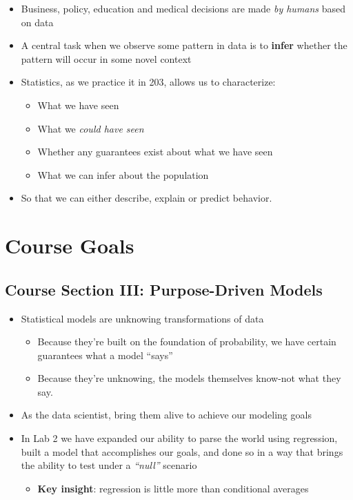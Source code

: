 \documentclass[
]{book}
\providecommand{\tightlist}{%
  \setlength{\itemsep}{0pt}\setlength{\parskip}{0pt}}
\theoremstyle{definition}
\theoremstyle{definition}
\theoremstyle{definition}
\theoremstyle{definition}
\theoremstyle{remark}
\begin{document}
\begin{itemize}
\item
  Business, policy, education and medical decisions are made \emph{by humans} based on data
\item
  A central task when we observe some pattern in data is to \textbf{infer} whether the pattern will occur in some novel context
\item
  Statistics, as we practice it in 203, allows us to characterize:

  \begin{itemize}
  \tightlist
  \item
    What we have seen
  \item
    What we \emph{could have seen}
  \item
    Whether any guarantees exist about what we have seen
  \item
    What we can infer about the population
  \end{itemize}
\item
  So that we can either describe, explain or predict behavior.
\end{itemize}

\hypertarget{course-goals}{%
\section{Course Goals}\label{course-goals}}

\hypertarget{course-section-iii-purpose-driven-models}{%
\subsection{Course Section III: Purpose-Driven Models}\label{course-section-iii-purpose-driven-models}}

\begin{itemize}
\item
  Statistical models are unknowing transformations of data

  \begin{itemize}
  \tightlist
  \item
    Because they're built on the foundation of probability, we have certain guarantees what a model ``says''
  \item
    Because they're unknowing, the models themselves know-not what they say.
  \end{itemize}
\item
  As the data scientist, bring them alive to achieve our modeling goals
\item
  In Lab 2 we have expanded our ability to parse the world using regression, built a model that accomplishes our goals, and done so in a way that brings the ability to test under a \emph{``null''} scenario

  \begin{itemize}
  \tightlist
  \item
    \textbf{Key insight}: regression is little more than conditional averages
  \end{itemize}
\end{itemize}
\end{document}
